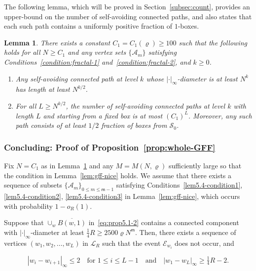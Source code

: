 \documentclass[a4paper]{article}
\numberwithin{equation}{section}
\newtheorem{lemma}[theorem]{Lemma}
\numberwithin{equation}{section}
\renewcommand{\1}{\mathbf{1}}
\begin{document}
The following lemma, which will be proved in Section~\ref{subsec:count}, provides an upper-bound on the number of self-avoiding connected paths, and also states that each such path contains a uniformly positive fraction of $1$-boxes.

\begin{lemma}\label{lem:path}
    There exists a constant $C_1 = C_1(\varrho) \geq 100$ such that the following holds for all $N \geq C_1$ and any vertex sets $\{\mathcal{A}_m\}$ satisfying Conditions~\ref{condition:fractal-1} and~\ref{condition:fractal-2}, and $k \geq 0$.
    
    \begin{enumerate}
        \item Any self-avoiding connected path at level $k$ whose $|\cdot|_\infty$-diameter is at least $N^k$ has length at least $N^{k/2}$. \label{claim:lem-path-1}

        \item For all $L \geq N^{k/2}$, the number of self-avoiding connected paths at level $k$ with length $L$ and starting from a fixed box is at most $(C_1)^L$. Moreover, any such path consists of at least $1/2$ fraction of boxes from $\mathcal{S}_0$. \label{claim:lem-path-2}
    \end{enumerate}
    
\end{lemma}

\subsubsection{Concluding: Proof of Proposition~\ref{prop:whole-GFF}}

Fix $N = C_1$ as in Lemma~\ref{lem:path} and any $M = M(N,\varrho)$ sufficiently large so that the condition in Lemma~\ref{lem:gff-nice} holds. We assume that there exists a sequence of subsets $\{\mathcal{A}_m\}_{0 \leq m \leq \mathsf m - 1}$ satisfying Conditions~\ref{lem5.4-condition1}, \ref{lem5.4-condition2}, \ref{lem5.4-condition3} in Lemma~\ref{lem:gff-nice}, which occurs with probability $1 - o_R(1)$.

Suppose that $\cup_w \overline{B(w, 1)}$ in~\eqref{eq:prop5.1-2} contains a connected component with $|\cdot|_\infty$-diameter at least $\frac{1}{4} R \geq 2500 \varrho N^{\mathsf m}$. Then, there exists a sequence of vertices $(w_1, w_2, \ldots, w_L)$ in $\mathscr{L}_R$ such that the event $\mathcal{E}_{w_i}$ does not occur, and

\begin{equation}\label{eq:sec5.1-path-1}
    |w_i - w_{i+1}|_\infty \leq 2 \quad \mbox{for } 1 \leq i \leq L -1 \quad \mbox{and} \quad |w_1 - w_L|_\infty \geq \tfrac{1}{4} R - 2.
\end{equation}
\end{document}
